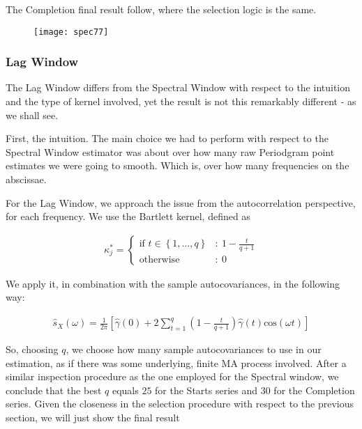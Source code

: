 \documentclass[12pt]{article} %
\begin{document}
The Completion final result follow, where the selection logic is the same.
 
\begin{figure}[H]
\begin{center}
\texttt{[image: spec77]}
\caption{}
\end{center}
\end{figure}

\subsubsection{Lag Window}

The Lag Window differs from the Spectral Window with respect to the intuition and the type of kernel involved, yet the result is not this remarkably different - as we shall see.

First, the intuition. The main choice we had to perform with respect to the Spectral Window estimator was about over how many raw Periodgram point estimates we were going to smooth. Which is, over how many frequencies on the abscissae. 

For the Lag Window, we approach the issue from the autocorrelation perspective, for each frequency. We use the Bartlett kernel, defined as

\begin{equation}
\begin{aligned}
\kappa_j^*= \begin{cases}
      \text{if $t\in\left\{1,...,q\right\}$} &:\  
        1-\frac{t}{q+1}\\
      \text{otherwise} &:\ 0  
   \end{cases}
\end{aligned}
\end{equation}

We apply it, in combination with the sample autocovariances, in the following way:

\begin{equation}
\begin{aligned}
\hat{s}_X(\omega)=\frac{1}{2\pi}\left[\hat{\gamma}(0)+2\sum\limits_{t=1}^{q}\left( 1-\frac{t}{q+1}\right) \hat{\gamma}(t)\text{cos}(\omega t)\right]
\end{aligned}
\end{equation}

So, choosing $q$, we choose how many sample autocovariances to use in our estimation, as if there was some underlying, finite MA process involved. After a similar inspection procedure as the one employed for the Spectral window, we conclude that the best $q$ equals $25$ for the Starts series and $30$ for the Completion series. Given the closeness in the selection procedure with respect to the previous section, we will just show the final result 
\end{document}
